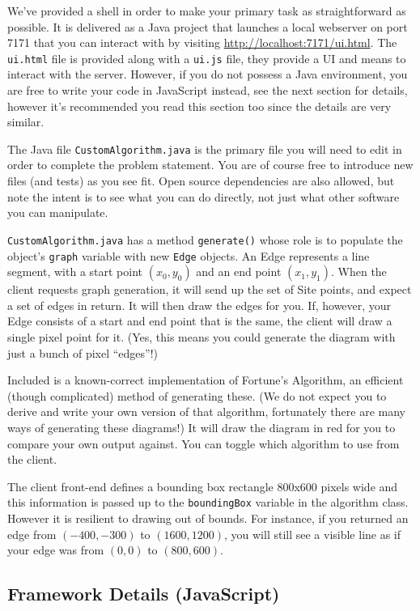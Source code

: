 \documentclass[12pt]{article}
\begin{document}
We've provided a shell in order to make your primary task as straightforward as
possible. It is delivered as a Java project that launches a local webserver on
port 7171 that you can interact with by visiting
\url{http://localhost:7171/ui.html}. The \texttt{ui.html} file is provided along with a
\texttt{ui.js} file, they provide a UI and means to interact with the server.
However, if you do not possess a Java environment, you
are free to write your code in JavaScript instead, see the next section for
details, however it's recommended you read this section too since the details
are very similar.

The Java file \texttt{CustomAlgorithm.java} is the primary file you will need to edit in
order to complete the problem statement. You are of course free to introduce new
files (and tests) as you see fit. Open source dependencies are also allowed, but
note the intent is to see what you can do directly, not just what other software you
can manipulate.

\texttt{CustomAlgorithm.java} has a method \texttt{generate()} whose role is to
populate the object's \texttt{graph} variable with new \texttt{Edge} objects. An
Edge represents a line segment, with a start point $(x_0, y_0)$ and an end point
$(x_1, y_1)$. When the client requests graph generation, it will send up the set
of Site points, and expect a set of edges in return. It will then draw the edges
for you. If, however, your Edge consists of a start and end point that is the
same, the client will draw a single pixel point for it. (Yes, this means you
could generate the diagram with just a bunch of pixel ``edges''!)

Included is a known-correct implementation of Fortune's Algorithm, an
efficient (though complicated) method of generating these. (We do not expect you
to derive and write your own version of that algorithm, fortunately there are
many ways of generating these diagrams!) It will draw the diagram in red for
you to compare your own output against. You can toggle which algorithm to use
from the client.

The client front-end defines a bounding box rectangle 800x600 pixels wide and
this information is passed up to the \texttt{boundingBox} variable in the
algorithm class. However it is resilient to drawing out of bounds. For instance,
if you returned an edge from $(-400, -300)$ to $(1600,1200)$, you will still see
a visible line as if your edge was from $(0,0)$ to $(800,600)$.

\subsection*{Framework Details (JavaScript)}
\end{document}
